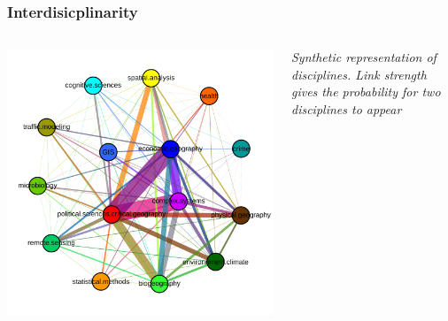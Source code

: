 \begin{frame}
\frametitle{Interdisicplinarity}

\begin{columns}
\begin{column}{0.6\textwidth}
\includegraphics[width=\textwidth]{figures/synththemcyb}
\end{column}
\begin{column}{0.4\textwidth}
\justify
\textit{Synthetic representation of disciplines. Link strength gives the probability for two disciplines to appear }
\end{column}
\end{columns}



\end{frame}




